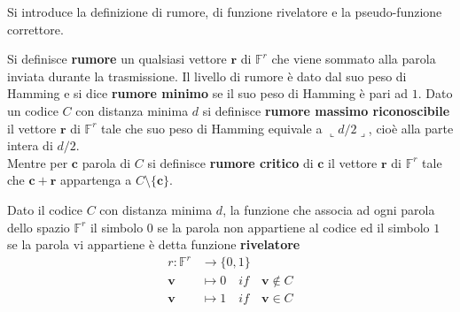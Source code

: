 \noindent
Si introduce la definizione di rumore, di funzione rivelatore e la pseudo-funzione correttore.
\begin{definizione}
   Si definisce {\bf rumore} un qualsiasi vettore $\mathbf{r} $ di $\mathbb{F}^{r}$ che viene sommato alla parola inviata durante la trasmissione. Il livello di rumore è dato dal suo peso di Hamming e si dice {\bf rumore minimo} se il suo peso di Hamming è pari ad $1$. Dato un codice $C$ con distanza minima $d$ si definisce {\bf rumore massimo riconoscibile} il vettore $\mathbf{r}$ di $\mathbb{F}^{r}$ tale che suo peso di Hamming equivale a $\llcorner d/2 \lrcorner$, cioè alla parte intera di $d/2$. \\
   Mentre per  $\mathbf{c}$ parola di $C$ si definisce {\bf rumore critico} di $\mathbf{c}$ il vettore $\mathbf{r}$ di $\mathbb{F}^{r}$ tale che $\mathbf{c}+ \mathbf{r}$ appartenga a $C \setminus \lbrace \mathbf{c} \rbrace $.
\end{definizione}

\begin{definizione}
   Dato il codice $C$ con distanza minima $d$, la funzione che associa ad ogni parola dello spazio $\mathbb{F}^{r}$ il simbolo $0$ se la parola non appartiene al codice ed il simbolo $1$ se la parola vi appartiene è detta funzione {\bf rivelatore}
   \begin{align*}
       r: \mathbb{F}^{r}   &\longrightarrow  \lbrace 0,1 \rbrace \\
            \mathbf{v}  &\longmapsto  0 \quad if \quad \mathbf{v} \notin C  \\
            \mathbf{v}  &\longmapsto  1 \quad if \quad  \mathbf{v} \in C
   \end{align*}
\end{definizione}


